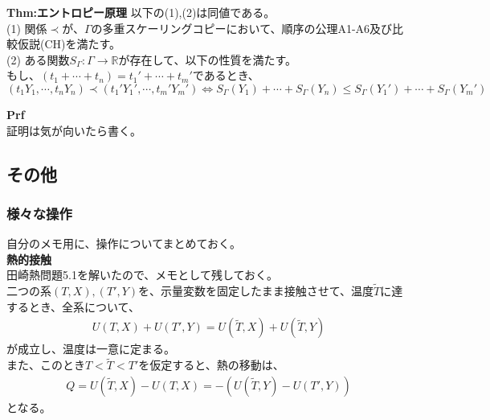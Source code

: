 \documentclass[a4paper,11pt]{jsarticle}
\numberwithin{equation}{section}
\begin{document}
\begin{itembox}[l]{\textbf{Thm:エントロピー原理}}
  以下の(1),(2)は同値である。\\
  (1) 関係$\prec$が、$\Gamma$の多重スケーリングコピーにおいて、順序の公理A1-A6及び比較仮説(CH)を満たす。\\
  (2) ある関数$S_{\Gamma}:\Gamma \rightarrow \mathbb{R}$が存在して、以下の性質を満たす。\\
  もし、$(t_1+ \cdots +t_n)=t_1'+ \cdots +t_m'$であるとき、
  \begin{equation}
      (t_1 Y_1, \cdots ,t_n Y_n) \prec (t_1' Y_1', \cdots ,t_m' Y_m') \Leftrightarrow S_{\Gamma}(Y_1)+ \cdots +S_{\Gamma}(Y_n) \leq S_{\Gamma}(Y_1')+ \cdots +S_{\Gamma}(Y_m')
  \end{equation}
\end{itembox}
\textbf{Prf}\\
証明は気が向いたら書く。\\

\subsection{その他}

\subsubsection{様々な操作}
自分のメモ用に、操作についてまとめておく。\\
\textbf{熱的接触}\\
田崎熱問題5.1を解いたので、メモとして残しておく。\\
二つの系$(T,X),(T',Y) $を、示量変数を固定したまま接触させて、温度$\tilde{T}$に達するとき、全系について、
\begin{align}
  U(T,X)+U(T',Y) = U(\tilde{T},X)+U(\tilde{T},Y)
\end{align}
が成立し、温度は一意に定まる。\\
また、このとき$T<\tilde{T}<T'$を仮定すると、熱の移動は、
\begin{align}
  Q = U(\tilde{T},X)-U(T,X) = -(U(\tilde{T},Y)-U(T',Y)) 
\end{align}
となる。\\
\end{document}
